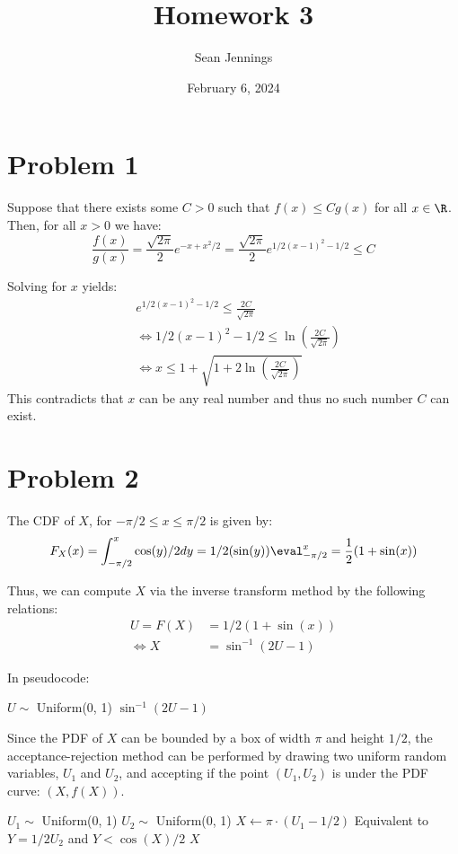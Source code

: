 \documentclass{homework}
\title{Homework 3}
\author{Sean Jennings}
\date{February 6, 2024}
\begin{document}
\maketitle

\section{Problem 1}
Suppose that there exists some $C>0$ such that $f(x) \leq Cg(x)$ for
all $x\in\R$. Then, for all $x>0$ we have:
\begin{equation*}
    \frac{f(x)}{g(x)} = \frac{\sqrt{2\pi}}{2} e^{-x + x^2/2}
        = \frac{\sqrt{2\pi}}{2} e^{1/2 (x-1)^2 - 1/2} \leq C
\end{equation*}

Solving for $x$ yields:
\begin{align*}
    &e^{1/2(x-1)^2 - 1/2} \leq \frac{2C}{\sqrt{2\pi}} \\
    &\Leftrightarrow 1/2 (x-1)^2 - 1/2 \leq \ln(\frac{2C}{\sqrt{2\pi}}) \\
    &\Leftrightarrow x \leq 1 + \sqrt{1 + 2 \ln(\frac{2C}{\sqrt{2\pi}})}
\end{align*}
This contradicts that $x$ can be any real number and thus no such
number $C$ can exist.

\section{Problem 2}
\begin{letterenum}
\item The CDF of $X$, for $-\pi/2 \leq x \leq \pi/2$ is given by:
\begin{equation*}
    F_X(x) = \int_{-\pi/2}^{x} \cos(y)/2 dy 
        = 1/2 (\sin(y))\eval_{-\pi/2}^x = \frac{1}{2} (1 + \sin(x))
\end{equation*}

Thus, we can compute $X$ via the inverse transform method by the following
relations:
\begin{align*}
    U = F(X) &= 1/2(1 + \sin(x)) \\
    \Leftrightarrow X &= \sin^{-1}(2U - 1)
\end{align*}

In pseudocode:
\begin{algorithmic}
    \State $U \sim$  Uniform(0, 1)
    \State \Return $\sin^{-1}(2U - 1)$
\end{algorithmic}

\item Since the PDF of $X$ can be bounded by a box of width $\pi$ and height
$1/2$, the acceptance-rejection method can be performed by drawing two uniform
random variables, $U_1$ and $U_2$, and accepting if the point $(U_1, U_2)$ is
under the PDF curve: $(X, f(X))$.

\begin{algorithmic}
    \Loop
        \State $U_1 \sim$ Uniform(0, 1)
        \State $U_2 \sim$ Uniform(0, 1)
        \State $X \gets \pi \cdot (U_1 - 1/2)$
            \Comment Equivalent to $Y=1/2 U_2$ and $Y < \cos(X)/2$
            \State \Return $X$
        \EndIf
    \EndLoop
\end{algorithmic}
\end{letterenum}
\end{document}
